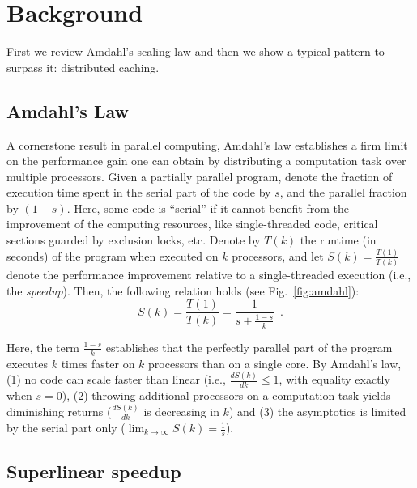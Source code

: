 \section{Background}\label{sec:background}

First we review Amdahl's scaling law and then we show a typical pattern to surpass it: distributed caching.

\subsection{Amdahl's Law}
\label{sec:amdahl-law}

A cornerstone result in parallel computing, Amdahl's law \cite{10.1145/1465482.1465560} establishes a firm limit on the performance gain one can obtain by distributing a computation task over multiple processors. Given a partially parallel program, denote the fraction of execution time spent %
in the serial part of the code by $s$, and the parallel fraction by $(1-s)$. Here, some code is ``serial'' if it cannot benefit from the improvement of the computing resources, like single-threaded code, critical sections guarded by exclusion locks, etc. Denote by $T(k)$ the runtime (in seconds) of the program when executed on $k$ processors, and let $S(k)=\frac{T(1)}{T(k)}$ denote the performance improvement relative to a single-threaded execution (i.e., the \emph{speedup}). Then, the following relation holds (see Fig.~\ref{fig:amdahl}):
\begin{equation}\label{eq:amdahl}
S(k) = \frac{T(1)}{T(k)} = \frac{1}{s + \frac{1-s}{k}} \enspace .
\end{equation}

Here, the term $\frac{1-s}{k}$ establishes that the perfectly parallel part of the program executes $k$ times faster on $k$ processors than on a single core. By Amdahl's law, (1) no code can scale faster than linear (i.e., $\frac{d S(k)}{d k} \le 1$, with equality exactly when $s=0$), (2) throwing additional processors on a computation task yields diminishing returns ($\frac{d S(k)}{d k}$ is decreasing in $k$) and (3) the asymptotics is limited by the serial part only ($\lim_{k\to \infty}S(k) = \frac1{s}$). 

\subsection{Superlinear speedup}
\label{sec:backgound-superlinear}


